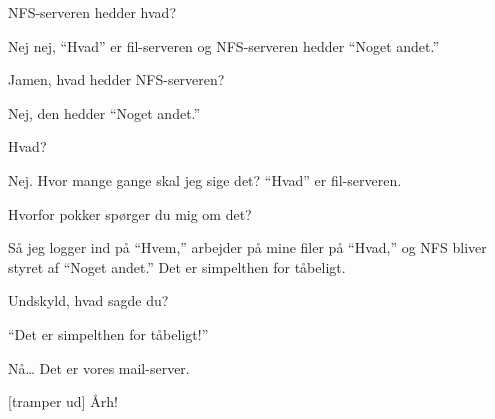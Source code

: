 \documentclass[10pt]{article}
\begin{document}
\begin{sketch}
 NFS-serveren hedder hvad?

 Nej nej, ``Hvad'' er fil-serveren og NFS-serveren hedder ``Noget andet.''

 Jamen, hvad hedder NFS-serveren?

 Nej, den hedder ``Noget andet.''

 Hvad?

 Nej. Hvor mange gange skal jeg sige det? ``Hvad'' er fil-serveren.

 Hvorfor pokker spørger du mig om det?


 Så jeg logger ind på ``Hvem,'' arbejder på mine filer på ``Hvad,'' og NFS bliver styret af ``Noget andet.'' Det er simpelthen for tåbeligt.

 Undskyld, hvad sagde du?

 ``Det er simpelthen for tåbeligt!''

 Nå\ldots{} Det er vores mail-server.

 [tramper ud]  Årh!

%
%
%
%
%
%
%
%
%
%
%
%
%

\end{sketch}
\end{document}
